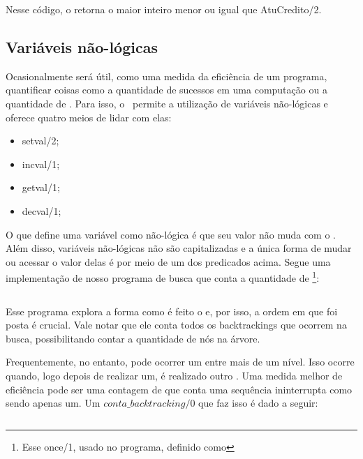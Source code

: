 \documentclass{article}
\begin{document}
\inputminted{prolog}{../Exemplos/Cap8/prog4_partilha2.pl}

Nesse código, o  retorna o maior inteiro menor ou igual que AtuCredito/2.

\subsection{Variáveis não-lógicas}

  Ocasionalmente será útil, como uma medida da eficiência de um programa, quantificar coisas como a quantidade de sucessos em uma computação ou a quantidade de . Para isso, o \eclipse\ permite a utilização de variáveis não-lógicas e oferece quatro meios de lidar com elas:

  \begin{itemize}
    \item setval/2;
    \item incval/1;
    \item getval/1;
    \item decval/1;
  \end{itemize}

  O que define uma variável como não-lógica é que seu valor não muda com o . Além disso, variáveis não-lógicas não são capitalizadas e a única forma de mudar ou acessar o valor delas é por meio de um dos predicados acima. Segue uma implementação de nosso programa de busca que conta a quantidade de \footnote{Esse once/1, usado no programa, definido como }:

\inputminted{prolog}{../Exemplos/Cap8/prog5_busca3.pl}

Esse programa explora a forma como é feito o  e, por isso, a ordem em que foi posta é crucial. Vale notar que ele conta todos os backtrackings que ocorrem na busca, possibilitando contar a quantidade de nós na árvore.

Frequentemente, no entanto, pode ocorrer um  entre mais de um nível. Isso ocorre quando, logo depois de realizar um, é realizado outro . Uma medida melhor de eficiência pode ser uma contagem de  que conta uma sequência ininterrupta como sendo apenas um. Um $conta\_backtracking/0$ que faz isso é dado a seguir:

\inputminted{prolog}{../Exemplos/Cap8/prog6_conta_backtrack.pl}
\end{document}
